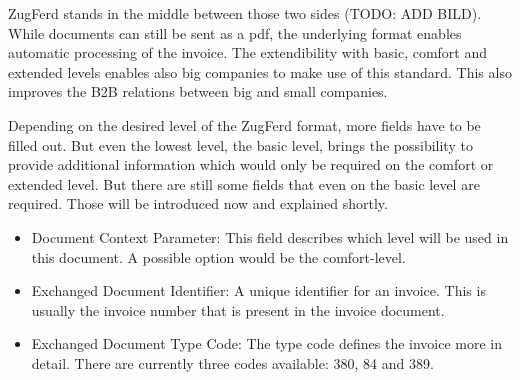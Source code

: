 ZugFerd stands in the middle between those two sides (TODO: ADD BILD). While documents can still be sent as a pdf, the underlying format enables automatic processing of the invoice. The extendibility with basic, comfort and extended levels enables also big companies to make use of this standard. This also improves the B2B relations between big and small companies.

Depending on the desired level of the ZugFerd format, more fields have to be filled out. But even the lowest level, the basic level, brings the possibility to provide additional information which would only be required on the comfort or extended level. But there are still some fields that even on the basic level are required. Those will be introduced now and explained shortly.
\begin{itemize}
	\item Document Context Parameter: This field describes which level will be used in this document. A possible option would be the comfort-level.
	\item Exchanged Document Identifier: A unique identifier for an invoice. This is usually the invoice number that is present in the invoice document.
	\item Exchanged Document Type Code: The type code defines the invoice more in detail. There are currently three codes available: 380, 84 and 389.
	

\end{itemize}
